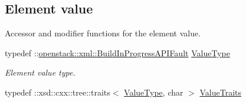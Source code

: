 \subsection*{Element value}
\label{_amgrp2ee2eae1a8c390ea033f241c027da8d6}
Accessor and modifier functions for the element value. \begin{DoxyCompactItemize}
\item 
\hypertarget{classopenstack_1_1xml_1_1BuildInProgress_a37999cd3f25d1038a64d6ebc462ef49e}{
typedef ::\hyperlink{classopenstack_1_1xml_1_1BuildInProgressAPIFault}{openstack::xml::BuildInProgressAPIFault} \hyperlink{classopenstack_1_1xml_1_1BuildInProgress_a37999cd3f25d1038a64d6ebc462ef49e}{ValueType}}
\label{classopenstack_1_1xml_1_1BuildInProgress_a37999cd3f25d1038a64d6ebc462ef49e}

\begin{DoxyCompactList}\small\item\em Element value type. \item\end{DoxyCompactList}\item 
\hypertarget{classopenstack_1_1xml_1_1BuildInProgress_a8c6bcb1d1b4d4228aa214b1eecf960e1}{
typedef ::xsd::cxx::tree::traits$<$ \hyperlink{classopenstack_1_1xml_1_1BuildInProgressAPIFault}{ValueType}, char $>$ \hyperlink{classopenstack_1_1xml_1_1BuildInProgress_a8c6bcb1d1b4d4228aa214b1eecf960e1}{ValueTraits}}
\label{classopenstack_1_1xml_1_1BuildInProgress_a8c6bcb1d1b4d4228aa214b1eecf960e1}


\end{DoxyCompactItemize}

